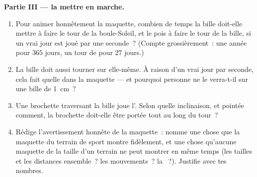 \begin{problem}
\medskip\noindent\textbf{Partie III --- la mettre en marche.}
\begin{enumerate}[resume]
  \item Pour animer honnêtement la maquette, combien de temps la
        bille doit-elle mettre à faire le tour de la boule-Soleil,
        et le pois à faire le tour de la bille, si un vrai jour est
        joué par une seconde~? (Compte grossièrement~: une année
        pour $365$ jours, un tour de  pour $27$ jours.)
  \item La bille doit aussi tourner sur elle-même. À raison d'un
        vrai jour par seconde, cela fait quelle  dans la
        maquette --- et pourquoi personne ne le verra-t-il sur une
        bille de \qty{1}{cm}~?
  \item Une brochette traversant la bille joue l'. Selon quelle
        inclinaison, et pointée comment, la brochette doit-elle
        être portée tout au long du tour~?
  \item Rédige l'avertissement honnête de la maquette~: nomme une
        chose que la maquette du terrain de sport montre
        fidèlement, et une chose qu'aucune maquette de la taille
        d'un terrain ne peut montrer en même temps (les tailles et
        les distances ensemble~? les mouvements~? la ~?).
        Justifie avec tes nombres.
\end{enumerate}
\end{problem}
